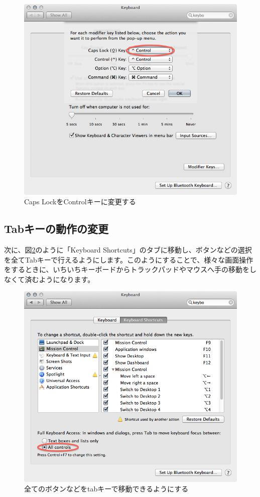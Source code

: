 \begin{figure}
  \centering
  \includegraphics[scale=0.35]{fig/Keyboard1.png}
  \caption{Caps LockをControlキーに変更する}
  \label{fig_Keyboard1_png}
\end{figure}

\subsection{Tabキーの動作の変更}
次に、図\ref{fig_Keyboard2_png}のように「Keyboard Shortcuts」のタブに移動し、ボタンなどの選択を全てTabキーで行えるようにします。このようにすることで、様々な画面操作をするときに、いちいちキーボードからトラックパッドやマウスへ手の移動をしなくて済むようになります。

\begin{figure}
  \centering
  \includegraphics[scale=0.35]{fig/Keyboard2.png}
  \caption{全てのボタンなどをtabキーで移動できるようにする}
  \label{fig_Keyboard2_png}
\end{figure}

